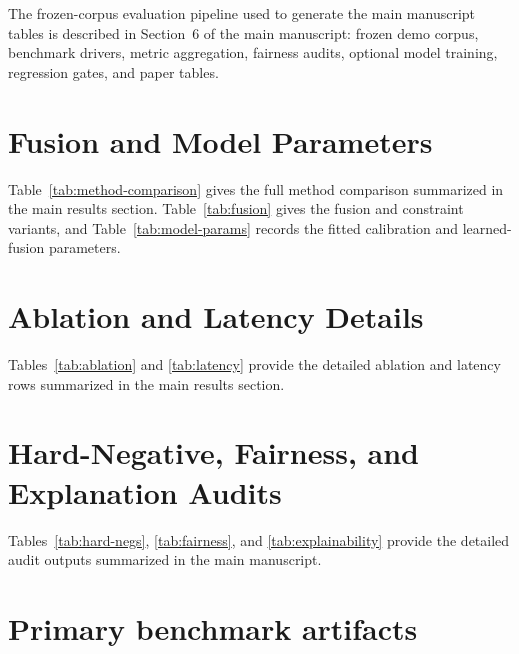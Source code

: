 \documentclass[11pt,a4paper]{article}
\newcommand{\suppTable}[1]{%
  \begin{table}[htbp]
  \centering
  
  \end{table}
}
\begin{document}
The frozen-corpus evaluation pipeline used to generate the main manuscript tables is described in Section~6 of the main manuscript: frozen demo corpus, benchmark drivers, metric aggregation, fairness audits, optional model training, regression gates, and paper tables.

\section*{Fusion and Model Parameters}

Table~\ref{tab:method-comparison} gives the full method comparison summarized in the main results section. Table~\ref{tab:fusion} gives the fusion and constraint variants, and Table~\ref{tab:model-params} records the fitted calibration and learned-fusion parameters.

\suppTable{tab-methods.tex}

\suppTable{tab-fusion.tex}

\suppTable{tab-model-params.tex}

\section*{Ablation and Latency Details}

Tables~\ref{tab:ablation} and \ref{tab:latency} provide the detailed ablation and latency rows summarized in the main results section.

\suppTable{tab-ablation.tex}

\suppTable{tab-latency.tex}

\section*{Hard-Negative, Fairness, and Explanation Audits}

Tables~\ref{tab:hard-negs}, \ref{tab:fairness}, and \ref{tab:explainability} provide the detailed audit outputs summarized in the main manuscript.

\suppTable{tab-hard-negs.tex}

\suppTable{tab-fairness.tex}

\suppTable{tab-explainability.tex}

\section*{Primary benchmark artifacts}
\end{document}
